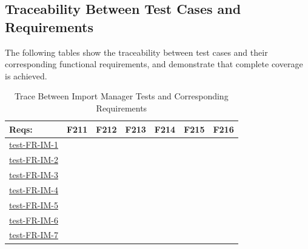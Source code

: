 \documentclass[12pt, titlepage]{article}
\begin{document}
\newpage

\subsection{Traceability Between Test Cases and Requirements}

\noindent The following tables show the traceability between test cases and their corresponding functional requirements, and demonstrate that complete coverage is achieved.\\

\newcommand{\obox}{\fbox{\rule{0pt}{1.5ex}\hspace{1.5ex}}}
\newcommand{\xbox}{\colorbox{black}{\rule{0pt}{1.5ex}\hspace{1.5ex}}}

\begin{table}[H]
\centering
\caption{Trace Between Import Manager Tests and Corresponding Requirements}
\label{tab:imt}
\small
\setlength{\tabcolsep}{3pt}
\begin{tabular}{l|*{6}{c}}
\toprule
\textbf{Reqs:} 
& F211 & F212 & F213 & F214 & F215 & F216\\
\midrule

\hyperref[sec:t-im-1]{test-FR-IM-1} & 
\xbox & \obox & \obox & \obox & \obox & \obox \\

\hyperref[sec:t-im-2]{test-FR-IM-2} & 
\obox & \xbox & \obox & \obox & \obox & \obox \\

\hyperref[sec:t-im-3]{test-FR-IM-3} & 
\xbox & \obox & \obox & \obox & \obox & \obox \\

\hyperref[sec:t-im-4]{test-FR-IM-4} & 
\obox & \obox & \xbox & \obox & \obox & \obox \\

\hyperref[sec:t-im-5]{test-FR-IM-5} & 
\obox & \obox & \obox & \xbox & \obox & \obox \\

\hyperref[sec:t-im-6]{test-FR-IM-6} & 
\obox & \obox & \obox & \obox & \xbox & \obox \\

\hyperref[sec:t-im-7]{test-FR-IM-7} & 
\obox & \obox & \obox & \obox & \obox & \xbox \\

\bottomrule
\end{tabular}
\end{table}
\end{document}
